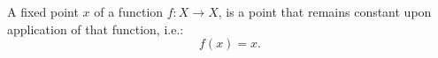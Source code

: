 \documentclass[12pt]{article}
\begin{document}
A fixed point $x$ of a function $f\colon X\to X$, is a point that remains constant upon application of that function, i.e.:
$$f(x)=x.$$
\end{document}
